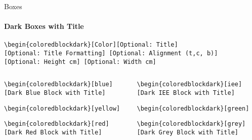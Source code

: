 \documentclass[aspectratio=169]{beamer}
\begin{document}
\begin{frame}{Boxes}
    \framesubtitle{Dark Boxes with Title}

    \vspace{-.8cm}
    \begin{coloredblock}[grey]
        \footnotesize\centering\texttt{\textbackslash begin\{coloredblockdark\}[Color][Optional:~Title][Optional:~Title~Formatting] [Optional:~Alignment (t,c, b)][Optional:~Height~cm] [Optional:~Width~cm]}
    \end{coloredblock}

    \vspace{-1.1cm}
    \begin{columns}
        \begin{column}{0.49\textwidth}
    
            \begin{coloredblockdark}
                \footnotesize\texttt{\textbackslash begin\{coloredblockdark\}[blue][Dark Blue Block with Title]}\strut
            \end{coloredblockdark}
    
            \begin{coloredblockdark}
                \footnotesize\texttt{\textbackslash begin\{coloredblockdark\}[yellow]}\strut
            \end{coloredblockdark}
    
            \begin{coloredblockdark}
                \footnotesize\texttt{\textbackslash begin\{coloredblockdark\}[red][Dark Red Block with Title]}\strut
            \end{coloredblockdark}
        
        \end{column}
        \begin{column}{0.49\textwidth}
    
            \begin{coloredblockdark}
                \footnotesize\texttt{\textbackslash begin\{coloredblockdark\}[iee][Dark IEE Block with Title]}\strut
            \end{coloredblockdark}
    
            \begin{coloredblockdark}
                \footnotesize\texttt{\textbackslash begin\{coloredblockdark\}[green]}\strut
            \end{coloredblockdark}
    
            \begin{coloredblockdark}
                \footnotesize\texttt{\textbackslash begin\{coloredblockdark\}[grey][Dark Grey Block with Title]}\strut
            \end{coloredblockdark}
        
        \end{column}
    \end{columns}
\end{frame}
\end{document}
